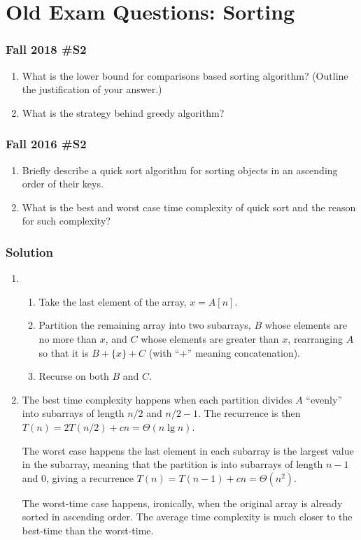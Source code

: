 \section{Old Exam Questions:  Sorting}

\subsubsection{Fall 2018 \#S2}
	\begin{enumerate}[label=\alph*.]
		\item What is the lower bound for comparisons based sorting algorithm? (Outline the justification of your answer.)
		\item What is the strategy behind greedy algorithm?
	\end{enumerate}



\subsubsection{Fall 2016 \#S2}
	\begin{enumerate}
		\item Briefly describe a quick sort algorithm for sorting objects in an ascending order of their keys.
		\item What is the best and worst case time complexity of quick sort and the reason for such complexity?
	\end{enumerate}
	
\subsubsection{Solution}

\begin{enumerate}
	\item 
	\begin{enumerate}
		\item Take the last element of the array, $x = A[n]$.  
		\item Partition the remaining array into two subarrays, $B$ whose elements are no more than $x$, and $C$ whose elements are greater than $x$, rearranging $A$ so that it is $B + \{x\} + C$ (with ``+'' meaning concatenation).
		\item Recurse on both $B$ and $C$.  
	\end{enumerate}
	\item The best time complexity happens when each partition divides $A$ ``evenly'' into subarrays of length $n/2$ and $n/2-1$.  The recurrence is then $T(n) = 2T(n/2) + cn = \Theta(n \lg n)$.  
	
	The worst case happens the last element in each subarray is the largest value in the subarray, meaning that the partition is into subarrays of length $n-1$ and $0$, giving a recurrence $T(n) = T(n-1) + cn = \Theta(n^2)$.  
	
	The worst-time case happens, ironically, when the original array is already sorted in ascending order.  The average time complexity is much closer to the best-time than the worst-time.  
\end{enumerate}


